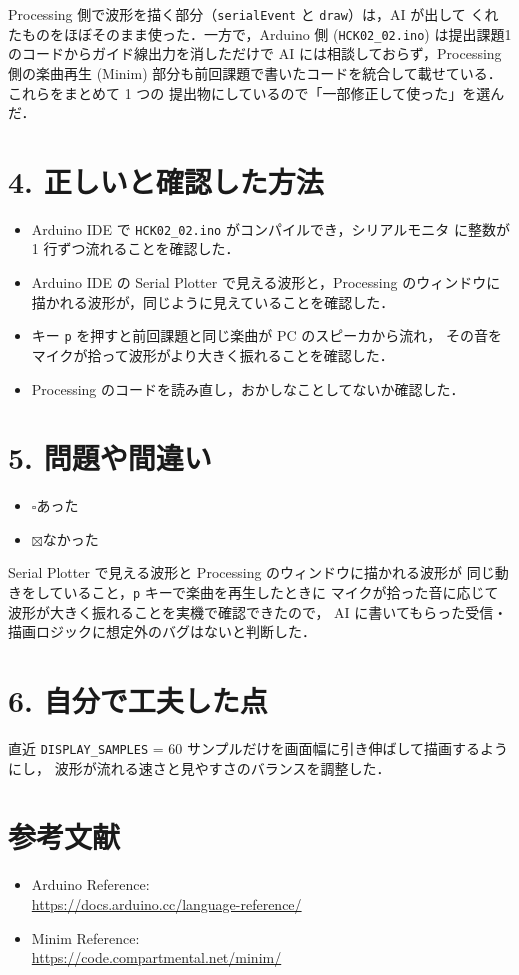 \documentclass[a4paper,11pt,dvipdfmx]{jsarticle}
\newcommand{\cboxon}{$\boxtimes$}
\newcommand{\cboxoff}{$\square$}
\begin{document}
Processing 側で波形を描く部分（\texttt{serialEvent} と \texttt{draw}）は，AI が出して
くれたものをほぼそのまま使った．一方で，Arduino 側 (\texttt{HCK02\_02.ino}) は提出課題1
のコードからガイド線出力を消しただけで AI には相談しておらず，Processing 側の楽曲再生
(Minim) 部分も前回課題で書いたコードを統合して載せている．これらをまとめて 1 つの
提出物にしているので「一部修正して使った」を選んだ．

\section*{4. 正しいと確認した方法}
\begin{itemize}
  \item Arduino IDE で \texttt{HCK02\_02.ino} がコンパイルでき，シリアルモニタ
        に整数が 1 行ずつ流れることを確認した．
  \item Arduino IDE の Serial Plotter で見える波形と，Processing のウィンドウに
        描かれる波形が，同じように見えていることを確認した．
  \item キー \texttt{p} を押すと前回課題と同じ楽曲が PC のスピーカから流れ，
        その音をマイクが拾って波形がより大きく振れることを確認した．
  \item Processing のコードを読み直し，おかしなことしてないか確認した．
\end{itemize}

\section*{5. 問題や間違い}
\begin{itemize}
  \item \cboxoff あった
  \item \cboxon なかった
\end{itemize}

Serial Plotter で見える波形と Processing のウィンドウに描かれる波形が
同じ動きをしていること，\texttt{p} キーで楽曲を再生したときに
マイクが拾った音に応じて波形が大きく振れることを実機で確認できたので，
AI に書いてもらった受信・描画ロジックに想定外のバグはないと判断した．

\section*{6. 自分で工夫した点}
直近 \texttt{DISPLAY\_SAMPLES} = 60 サンプルだけを画面幅に引き伸ばして描画するようにし，
波形が流れる速さと見やすさのバランスを調整した．

\section*{参考文献}
\begin{itemize}
  \item Arduino Reference: \\
        \url{https://docs.arduino.cc/language-reference/}
  \item Minim Reference:\\
        \url{https://code.compartmental.net/minim/}
\end{itemize}
\end{document}
